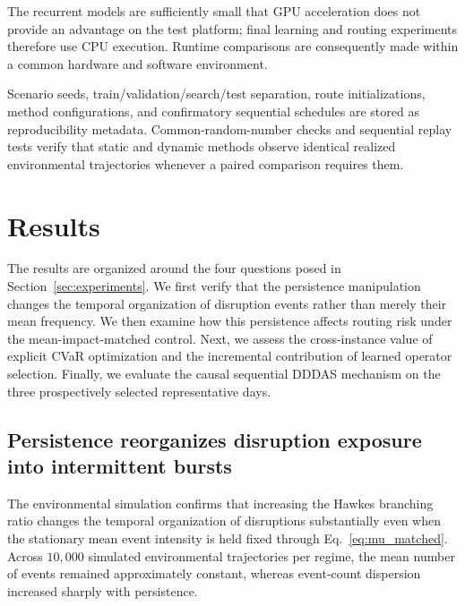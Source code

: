 \documentclass[preprint,12pt]{elsarticle}
\newcommand{\1}{\mathbf{1}}
\begin{document}
The recurrent models are sufficiently small that GPU acceleration does not
provide an advantage on the test platform; final learning and routing
experiments therefore use CPU execution. Runtime comparisons are consequently
made within a common hardware and software environment.

Scenario seeds, train/validation/search/test separation, route initializations,
method configurations, and confirmatory sequential schedules are stored as
reproducibility metadata. Common-random-number checks and sequential replay
tests verify that static and dynamic methods observe identical realized
environmental trajectories whenever a paired comparison requires them.













\section{Results}
\label{sec:results}

The results are organized around the four questions posed in
Section~\ref{sec:experiments}. We first verify that the persistence manipulation
changes the temporal organization of disruption events rather than merely their
mean frequency. We then examine how this persistence affects routing risk under
the mean-impact-matched control. Next, we assess the cross-instance value of
explicit CVaR optimization and the incremental contribution of learned operator
selection. Finally, we evaluate the causal sequential DDDAS mechanism on the
three prospectively selected representative days.

\subsection{Persistence reorganizes disruption exposure into intermittent bursts}
\label{subsec:results_environment}

The environmental simulation confirms that increasing the Hawkes branching
ratio changes the temporal organization of disruptions substantially even when
the stationary mean event intensity is held fixed through
Eq.~\eqref{eq:mu_matched}.
Across $10{,}000$ simulated environmental trajectories per regime, the mean
number of events remained approximately constant, whereas event-count
dispersion increased sharply with persistence.
\end{document}
